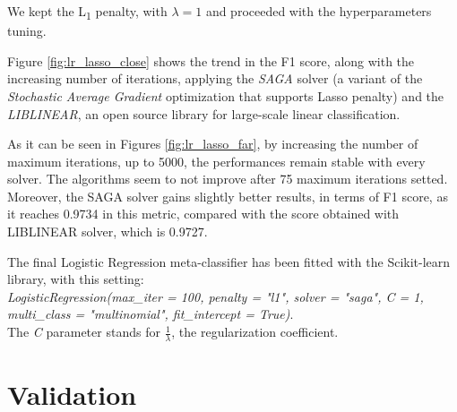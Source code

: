 We kept the L\textsubscript{1} penalty, with $ \lambda  = 1 $   and proceeded with the hyperparameters tuning.

Figure \ref{fig:lr_lasso_close} shows the trend in the F1 score, along with the increasing number of iterations, applying the \textit{SAGA}\cite{SAGA} solver (a variant of the \textit{Stochastic Average Gradient}\cite{SAG} optimization that supports Lasso penalty) and the \textit{LIBLINEAR}\cite{Liblinear}, an open source library for large-scale linear classification.

As it can be seen in Figures \ref{fig:lr_lasso_far}, by increasing the number of maximum iterations, up to 5000, the performances remain stable with every solver.
The algorithms seem to not improve after 75 maximum iterations setted.
Moreover, the SAGA solver gains slightly better results, in terms of F1 score, as it reaches 0.9734 in this metric, compared with the score obtained with LIBLINEAR solver, which is 0.9727.

The final Logistic Regression meta-classifier has been fitted with the Scikit-learn library, with this setting:\\
\textit{LogisticRegression(max\_iter = 100, penalty = "l1", solver = "saga", C = 1, multi\_class = "multinomial", fit\_intercept = True)}.\\
The \textit{C} parameter stands for $ \frac{1}{\lambda} $, the regularization coefficient.

\section{Validation}